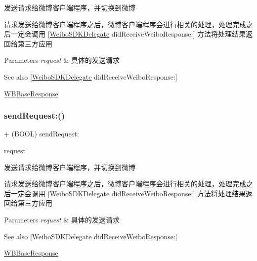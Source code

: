 发送请求给微博客户端程序，并切换到微博

请求发送给微博客户端程序之后，微博客户端程序会进行相关的处理，处理完成之后一定会调用 \mbox{[}\mbox{\hyperlink{class_weibo_s_d_k_delegate-p}{Weibo\+S\+D\+K\+Delegate}} did\+Receive\+Weibo\+Response\+:\mbox{]} 方法将处理结果返回给第三方应用


\begin{DoxyParams}{Parameters}
{\em request} & 具体的发送请求\\
\hline
\end{DoxyParams}
\begin{DoxySeeAlso}{See also}
\mbox{[}\mbox{\hyperlink{class_weibo_s_d_k_delegate-p}{Weibo\+S\+D\+K\+Delegate}} did\+Receive\+Weibo\+Response\+:\mbox{]} 

\mbox{\hyperlink{interface_w_b_base_response}{W\+B\+Base\+Response}} 
\end{DoxySeeAlso}
\mbox{\label{interface_weibo_s_d_k_a765c7577fb1d6bf1e4ebf0ecdd4f6268}} 
\subsubsection{\texorpdfstring{send\+Request\+:()}{sendRequest:()}\hspace{0.1cm}{\footnotesize\ttfamily [2/3]}}
{\footnotesize\ttfamily + (B\+O\+OL) send\+Request\+: \begin{DoxyParamCaption}\item[{(\mbox{\hyperlink{interface_w_b_base_request}{W\+B\+Base\+Request}} $\ast$)}]{request }\end{DoxyParamCaption}}

发送请求给微博客户端程序，并切换到微博

请求发送给微博客户端程序之后，微博客户端程序会进行相关的处理，处理完成之后一定会调用 \mbox{[}\mbox{\hyperlink{class_weibo_s_d_k_delegate-p}{Weibo\+S\+D\+K\+Delegate}} did\+Receive\+Weibo\+Response\+:\mbox{]} 方法将处理结果返回给第三方应用


\begin{DoxyParams}{Parameters}
{\em request} & 具体的发送请求\\
\hline
\end{DoxyParams}
\begin{DoxySeeAlso}{See also}
\mbox{[}\mbox{\hyperlink{class_weibo_s_d_k_delegate-p}{Weibo\+S\+D\+K\+Delegate}} did\+Receive\+Weibo\+Response\+:\mbox{]} 

\mbox{\hyperlink{interface_w_b_base_response}{W\+B\+Base\+Response}} 
\end{DoxySeeAlso}
\mbox{\label{interface_weibo_s_d_k_a765c7577fb1d6bf1e4ebf0ecdd4f6268}} 
